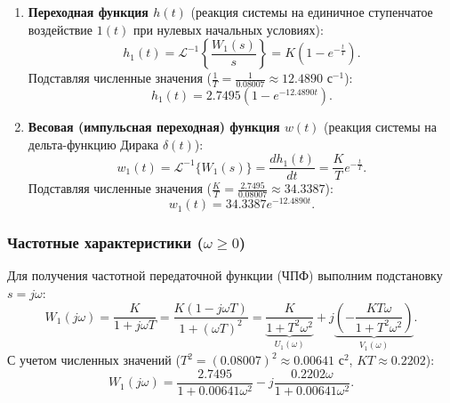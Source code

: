 \documentclass[12pt, a4paper]{article}
\begin{document}
\begin{enumerate}
    \item \textbf{Переходная функция $h(t)$} (реакция системы на единичное ступенчатое воздействие $1(t)$ при нулевых начальных условиях):
    \begin{equation}
        h_1(t) = \mathcal{L}^{-1}\left\{\frac{W_1(s)}{s}\right\} = K\left(1 - e^{-\frac{t}{T}}\right).
    \end{equation}
    Подставляя численные значения ($\frac{1}{T} = \frac{1}{0.08007} \approx 12.4890\text{ с}^{-1}$):
    \begin{equation}
        h_1(t) = 2.7495\left(1 - e^{-12.4890t}\right).
    \end{equation}

    \item \textbf{Весовая (импульсная переходная) функция $w(t)$} (реакция системы на дельта-функцию Дирака $\delta(t)$):
    \begin{equation}
        w_1(t) = \mathcal{L}^{-1}\{W_1(s)\} = \frac{dh_1(t)}{dt} = \frac{K}{T}e^{-\frac{t}{T}}.
    \end{equation}
    Подставляя численные значения ($\frac{K}{T} = \frac{2.7495}{0.08007} \approx 34.3387$):
    \begin{equation}
        w_1(t) = 34.3387e^{-12.4890t}.
    \end{equation}
\end{enumerate}

\subsubsection{Частотные характеристики ($\omega \ge 0$)}

Для получения частотной передаточной функции (ЧПФ) выполним подстановку $s = j\omega$:
\begin{equation}
    W_1(j\omega) = \frac{K}{1 + j\omega T} = \frac{K(1 - j\omega T)}{1 + (\omega T)^2} = \underbrace{\frac{K}{1 + T^2\omega^2}}_{U_1(\omega)} + j\underbrace{\left(-\frac{KT\omega}{1 + T^2\omega^2}\right)}_{V_1(\omega)}.
\end{equation}
С учетом численных значений ($T^2 = (0.08007)^2 \approx 0.00641\text{ с}^2$, $KT \approx 0.2202$):
\begin{equation}
    W_1(j\omega) = \frac{2.7495}{1 + 0.00641\omega^2} - j\frac{0.2202\omega}{1 + 0.00641\omega^2}.
\end{equation}
\end{document}
